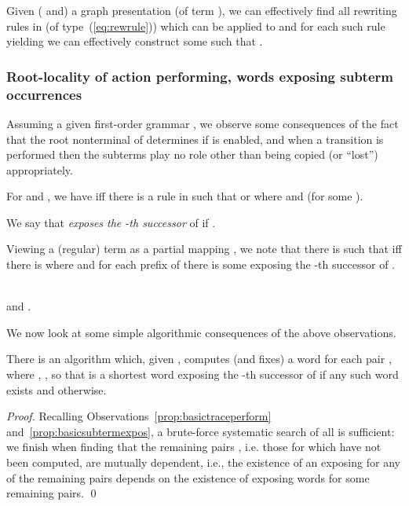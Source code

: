 \documentclass[12pt]{article}
\begin{document}
\begin{observ}
Given ( and) a graph presentation  (of term ), we can effectively 
find all rewriting rules in  (of type~(\ref{eq:rewrule})) which
can be applied to  and for each such rule yielding 
 we can effectively construct some  such that . 
\end{observ}


\subsubsection*{Root-locality of action performing, 
words exposing subterm occurrences}

Assuming a given first-order grammar ,
we observe some consequences of
the fact that the root nonterminal of  
determines if  is enabled, and when a transition is performed
then the subterms  play no role other than being copied
(or ``lost'')
appropriately.



\begin{observ}\label{prop:basictraceperform}
For   and  ,  
we have  iff 
there is a rule  in
 such that  or  where 
 and  (for some ).
\end{observ}
We say that 
 \emph{exposes the -th successor} of 
if  .

\begin{observ}\label{prop:basicsubtermexpos}
Viewing a (regular) term  as a partial mapping
, we note that there is  such that 
 iff there is  where  and
for each  prefix  of
 there is some  exposing the -th successor of
. 
\end{observ}

\begin{observ}\label{prop:segmenttraces}

\\

 and .
\end{observ}
We now look at some simple algorithmic consequences 
of the above observations.

\begin{prop}\label{prop:computwXi}
There is an algorithm which, given 
, computes (and fixes) a word 
for each pair , where
 , , so that 
 is a shortest word exposing the -th
successor of  if any such word exists and
 otherwise.
\end{prop}

\begin{proof}
Recalling Observations~\ref{prop:basictraceperform}
and~\ref{prop:basicsubtermexpos},
a brute-force systematic search of all  is
sufficient:
we finish when
finding that the remaining pairs , i.e. those
for which  have not been
computed, are mutually dependent, i.e., the existence of an exposing 
  for any of the 
 remaining pairs depends on the existence of exposing
 words for some remaining pairs. 
\qed
\end{proof}
\end{document}
